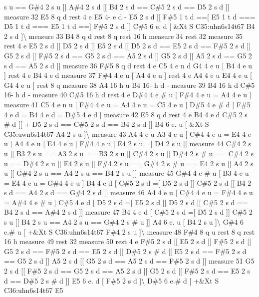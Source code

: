 s u == G\#4 2 s u \mbox{]}\mbox{]} A\#4 2 s d \mbox{[}\mbox{[} B4 2 s d == C\#5 2 s d == D5 2 s d \mbox{]}\mbox{]} measure 32 E5 8 q d rest 4 e E5 4-\/ e d -\/ E5 2 s d \mbox{[}\mbox{[} F\#5 1 t d ==\mbox{[} E5 1 t d === D5 1 t d === E5 1 t d ==\mbox{]} F\#5 2 s d \mbox{]}\mbox{]} C\#5 6 e. d \mbox{[} \&Xt S C35\+:uhn6s14t67 B4 2 s d \mbox{]}\textbackslash{} measure 33 B4 8 q d rest 8 q rest 16 h measure 34 rest 32 measure 35 rest 4 e E5 2 s d \mbox{[}\mbox{[} D5 2 s d \mbox{]}\mbox{]} E5 2 s d \mbox{[}\mbox{[} D5 2 s d == E5 2 s d == F\#5 2 s d \mbox{]}\mbox{]} G5 2 s d \mbox{[}\mbox{[} F\#5 2 s d == G5 2 s d == A5 2 s d \mbox{]}\mbox{]} G5 2 s d \mbox{[}\mbox{[} A5 2 s d == G5 2 s d == A5 2 s d \mbox{]}\mbox{]} measure 36 F\#5 8 q d rest 4 e C5 4 e n d G4 4 e u \mbox{[} B4 4 e u \mbox{]} rest 4 e B4 4 e d measure 37 F\#4 4 e u \mbox{[} A4 4 e u \mbox{]} rest 4 e A4 4 e u E4 4 e u \mbox{[} G4 4 e u \mbox{]} rest 8 q measure 38 A4 16 h u B4 16-\/ h d -\/ measure 39 B4 16 h d C\#5 16-\/ h d -\/ measure 40 C\#5 16 h d rest 4 e D\#4 4 e \# u \mbox{[} F\#4 4 e u = A4 4 e u \mbox{]} measure 41 C5 4 e n u \mbox{[} F\#4 4 e u = A4 4 e u = C5 4 e u \mbox{]} D\#5 4 e \# d \mbox{[} F\#5 4 e d = B4 4 e d = D\#5 4 e d \mbox{]} measure 42 E5 8 q d rest 4 e B4 4 e d C\#5 2 s \# d \mbox{[}\mbox{[} + D5 2 s d == C\#5 2 s d == B4 2 s d \mbox{]}\mbox{]} B4 6 e. u \mbox{[} \&Xt S C35\+:uwn6s14t67 A4 2 s u \mbox{]}\textbackslash{} measure 43 A4 4 e u A3 4 e u \mbox{[} C\#4 4 e u = E4 4 e u \mbox{]} A4 4 e u \mbox{[} E4 4 e u \mbox{]} F\#4 4 e u \mbox{[} E4 2 s u =\mbox{[} D4 2 s u \mbox{]}\mbox{]} measure 44 C\#4 2 s u \mbox{[}\mbox{[} B3 2 s u == A3 2 s u == B3 2 s u \mbox{]}\mbox{]} C\#4 2 s u \mbox{[}\mbox{[} D\#4 2 s \# u == C\#4 2 s u == D\#4 2 s u \mbox{]}\mbox{]} E4 2 s u \mbox{[}\mbox{[} F\#4 2 s u == G\#4 2 s \# u == E4 2 s u \mbox{]}\mbox{]} A4 2 s u \mbox{[}\mbox{[} G\#4 2 s u == A4 2 s u == B4 2 s u \mbox{]}\mbox{]} measure 45 G\#4 4 e \# u \mbox{[} B3 4 e u = E4 4 e u = G\#4 4 e u \mbox{]} B4 4 e d \mbox{[} C\#5 2 s d =\mbox{[} D5 2 s d \mbox{]}\mbox{]} C\#5 2 s d \mbox{[}\mbox{[} B4 2 s d == A4 2 s d == G\#4 2 s d \mbox{]}\mbox{]} measure 46 A4 4 e u \mbox{[} C\#4 4 e u = F\#4 4 e u = A\#4 4 e \# u \mbox{]} C\#5 4 e d \mbox{[} D5 2 s d =\mbox{[} E5 2 s d \mbox{]}\mbox{]} D5 2 s d \mbox{[}\mbox{[} C\#5 2 s d == B4 2 s d == A\#4 2 s d \mbox{]}\mbox{]} measure 47 B4 4 e d \mbox{[} C\#5 2 s d =\mbox{[} D5 2 s d \mbox{]}\mbox{]} C\#5 2 s u \mbox{[}\mbox{[} B4 2 s u == A4 2 s u == G\#4 2 s \# u \mbox{]}\mbox{]} A4 6 e. u \mbox{[} B4 2 s u \mbox{]}\textbackslash{} G\#4 6 e.\# u \mbox{[} +\&Xt S C36\+:uhn6s14t67 F\#4 2 s u \mbox{]}\textbackslash{} measure 48 F\#4 8 q u rest 8 q rest 16 h measure 49 rest 32 measure 50 rest 4 e F\#5 2 s d \mbox{[}\mbox{[} E5 2 s d \mbox{]}\mbox{]} F\#5 2 s d \mbox{[}\mbox{[} G5 2 s d == F\#5 2 s d == E5 2 s d \mbox{]}\mbox{]} D\#5 2 s \# d \mbox{[}\mbox{[} E5 2 s d == F\#5 2 s d == G5 2 s d \mbox{]}\mbox{]} A5 2 s d \mbox{[}\mbox{[} G5 2 s d == A5 2 s d == F\#5 2 s d \mbox{]}\mbox{]} measure 51 G5 2 s d \mbox{[}\mbox{[} F\#5 2 s d == G5 2 s d == A5 2 s d \mbox{]}\mbox{]} G5 2 s d \mbox{[}\mbox{[} F\#5 2 s d == E5 2 s d == D\#5 2 s \# d \mbox{]}\mbox{]} E5 6 e. d \mbox{[} F\#5 2 s d \mbox{]}\textbackslash{} D\#5 6 e.\# d \mbox{[} +\&Xt S C36\+:uhn6s14t67 E5 